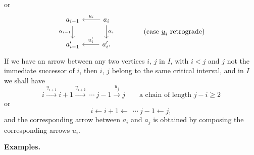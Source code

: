 \documentclass[11pt]{article}
\newcommand{\printedpage}[1]{\marginpar{\footnotesize p.~#1}}
\newcommand{\msp}[1]{\marginpar{\footnotesize [#1]}}
\begin{document}
\printedpage{10}
or
\[
\begin{tikzcd}
a_{i-1} \arrow[d, "\alpha_{i-1}"'] & a_i \arrow[l, "u_i"'] \arrow[d, "\alpha_i"] \\
a'_{i-1} & a'_i. \arrow[l, "u'_i"']
\end{tikzcd}
\qquad\qquad \text{(case $\underline{u}_i$ retrograde)}
\]
If we have an arrow between any two vertices $i$, $j$ in $I$, with $i < j$ and $j$ not the immediate successor of $i$, then $i$, $j$ belong to the same critical interval, and in $I$ we shall have %
\[
i \xrightarrow{\underline{u}_{i+1}} i+1 \xrightarrow{\underline{u}_{i+2}}\ \cdots\ j-1 \xrightarrow{\underline{u}_j} j \qquad \text{a chain of length } j-i \geq 2 %
\]
or
\[
i \longleftarrow i+1 \longleftarrow\ \ \cdots\ j-1 \longleftarrow j,
\]
and the corresponding arrow between $a_i$ and $a_j$ is obtained by composing the corresponding arrows $u_i$.

\msp{page 15}

\textbf{Examples.}
\end{document}
